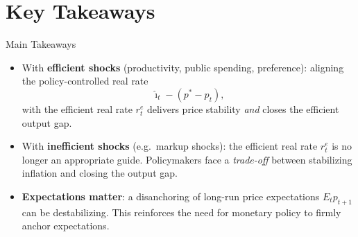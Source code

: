 \documentclass[11pt,aspectratio=169]{beamer}
\begin{document}
\section{Key Takeaways}

\begin{frame}{Main Takeaways}
\small
\begin{itemize}
  \item With \textbf{efficient shocks} (productivity, public spending, preference): 
  aligning the policy-controlled real rate 
  \[
      \hat{\imath}_t - (p^{*} - p_t),
  \]
  with the efficient real rate \(r_t^{e}\) delivers price stability \emph{and} closes the efficient output gap.
  
  \vspace{0.35cm}
  
  \item With \textbf{inefficient shocks} (e.g.\ markup shocks): 
  the efficient real rate \(r_t^{e}\) is no longer an appropriate guide. 
  Policymakers face a \emph{trade-off} between stabilizing inflation and closing the output gap.
  
  \vspace{0.35cm}
  
  \item \textbf{Expectations matter}: 
  a disanchoring of long-run price expectations \(E_t p_{t+1}\) can be destabilizing. 
  This reinforces the need for monetary policy to firmly anchor expectations.
\end{itemize}
\end{frame}

\appendix
\end{document}
